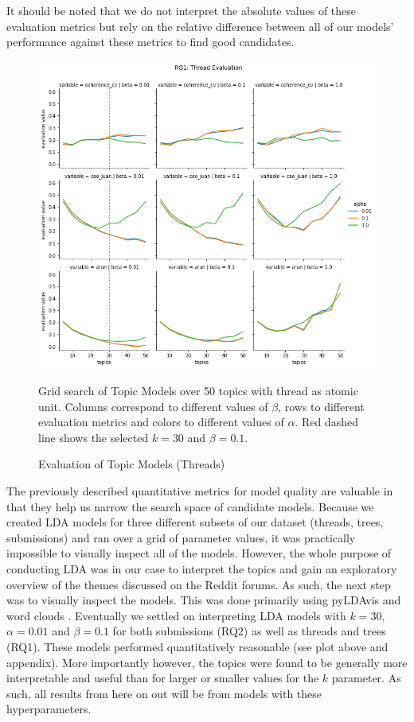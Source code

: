 \documentclass{article}
\begin{document}
It should be noted that we do not interpret the absolute values of these evaluation metrics but rely on the relative difference between all of our models' performance against these metrics to find good candidates. 

\begin{figure}[H]
    \begin{centering}
    \includegraphics[scale=0.4]{../Figure/H1_thread_red.png}
    \caption{Evaluation of Topic Models (Threads)}
    \end{centering}
    \begin{footnotesize} 
        Grid search of Topic Models over 50 topics with thread as atomic unit. Columns correspond to different values of $\beta$, rows to different evaluation metrics and colors to different values of $\alpha$. Red dashed line shows the selected $k = 30$ and $\beta = 0.1$. 
    \end{footnotesize}
\end{figure}

The previously described quantitative metrics for model quality are valuable in that they help us narrow the search space of candidate models. Because we created LDA models for three different subsets of our dataset (threads, trees, submissions) and ran over a grid of parameter values, it was practically impossible to visually inspect all of the models. However, the whole purpose of conducting LDA was in our case to interpret the topics and gain an exploratory overview of the themes discussed on the Reddit forums. As such, the next step was to visually inspect the models. This was done primarily using pyLDAvis and word clouds \cite{sievert2014ldavis}. 
Eventually we settled on interpreting LDA models with $k = 30$, $\alpha = 0.01$ and $\beta = 0.1$ for both submissions (RQ2) as well as threads and trees (RQ1). These models performed quantitatively reasonable (see plot above and appendix). More importantly however, the topics were found to be generally more interpretable and useful than for larger or smaller values for the $k$ parameter. As such, all results from here on out will be from models with these hyperparameters. 
\end{document}
